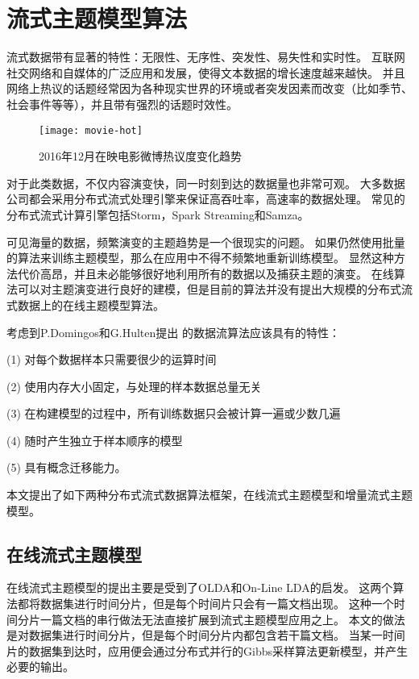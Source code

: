 \section{流式主题模型算法} 
流式数据带有显著的特性：无限性、无序性、突发性、易失性和实时性。
互联网社交网络和自媒体的广泛应用和发展，使得文本数据的增长速度越来越快。
并且网络上热议的话题经常因为各种现实世界的环境或者突发因素而改变（比如季节、社会事件等等），并且带有强烈的话题时效性。
\begin{figure}[htb]\centering
  \texttt{[image: movie-hot]}
  \caption{2016年12月在映电影微博热议度变化趋势}
  \label{fig:LDA}       %
\end{figure}

对于此类数据，不仅内容演变快，同一时刻到达的数据量也非常可观。
大多数据公司都会采用分布式流式处理引擎来保证高吞吐率，高速率的数据处理。
常见的分布式流式计算引擎包括Storm，Spark Streaming和Samza。

可见海量的数据，频繁演变的主题趋势是一个很现实的问题。
如果仍然使用批量的算法来训练主题模型，那么在应用中不得不频繁地重新训练模型。
显然这种方法代价高昂，并且未必能够很好地利用所有的数据以及捕获主题的演变。
在线算法可以对主题演变进行良好的建模，但是目前的算法并没有提出大规模的分布式流式数据上的在线主题模型算法。

考虑到P.Domingos和G.Hulten\cite{Domingos01catchingup}提出
的数据流算法应该具有的特性：

(1) 对每个数据样本只需要很少的运算时间

(2) 使用内存大小固定，与处理的样本数据总量无关

(3) 在构建模型的过程中，所有训练数据只会被计算一遍或少数几遍

(4) 随时产生独立于样本顺序的模型

(5) 具有概念迁移能力。

本文提出了如下两种分布式流式数据算法框架，在线流式主题模型和增量流式主题模型。

\subsection{在线流式主题模型}
在线流式主题模型的提出主要是受到了OLDA\cite{hoffman2010online}和On-Line LDA\cite{alsumait2008on-line}的启发。
这两个算法都将数据集进行时间分片，但是每个时间片只会有一篇文档出现。
这种一个时间分片一篇文档的串行做法无法直接扩展到流式主题模型应用之上。
本文的做法是对数据集进行时间分片，但是每个时间分片内都包含若干篇文档。
当某一时间片的数据集到达时，应用便会通过分布式并行的Gibbs采样算法更新模型，并产生必要的输出。

